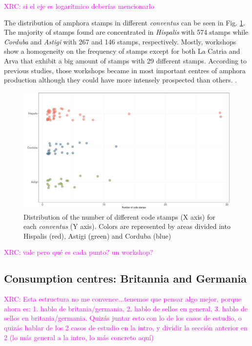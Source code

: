 \documentclass[review]{elsarticle}
\newcommand{\memo}[2]{\textcolor{#1}{#2}}
\newcommand{\xavi}[1]{\memo{magenta}{XRC: #1\\}}
\begin{document}
\xavi{si el eje es logarítmico deberías mencionarlo}


The distribution of amphora stamps in different \textit{conventus} can be seen in Fig. \ref{frequency}. The majority of stamps found are concentrated in \textit{Hispalis} with 574 stamps while \textit{Corduba} and \textit{Astigi} with 267 and 146 stamps, respectively. Mostly, workshops show a homogeneity on the frequency of stamps except for both La Catria and Arva that exhibit a big amount of stamps with 29 different stamps. According to previous studies, those workshops became in most important centres of amphora production although they could have more intensely prospected than others. \citep{arva_1997}.
 
\begin{figure}[htp]
	\centering
\includegraphics[width=\linewidth]{figs/frequency}
\caption{Distribution of the number of different code stamps (X axis) for each \textit{conventus} (Y axis). Colors are represented by areas divided into Hispalis (red), Astigi (green) and Corduba (blue)}
\label{frequency}
\end{figure} 

\xavi{vale pero qué es cada punto? un workshop?}


\subsection{Consumption centres: Britannia and Germania}

\xavi{Esta estructura no me convence...tenemos que pensar algo mejor, porque ahora es: 1. hablo de britania/germania, 2. hablo de sellos en general, 3. hablo de sellos en britania/germania. Quizás juntar esto con lo de los casos de estudio, o quizás hablar de los 2 casos de estudio en la intro, y dividir la sección anterior en 2 (lo más general a la intro, lo más concreto aquí)}
\end{document}
